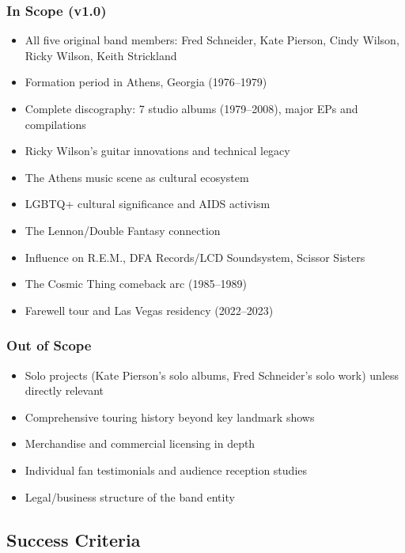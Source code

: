 \documentclass[11pt,letterpaper]{article}
\begin{document}
\subsubsection{In Scope (v1.0)}

\begin{itemize}[noitemsep]
  \item All five original band members: Fred Schneider, Kate Pierson, Cindy Wilson, Ricky Wilson, Keith Strickland
  \item Formation period in Athens, Georgia (1976--1979)
  \item Complete discography: 7 studio albums (1979--2008), major EPs and compilations
  \item Ricky Wilson's guitar innovations and technical legacy
  \item The Athens music scene as cultural ecosystem
  \item LGBTQ+ cultural significance and AIDS activism
  \item The Lennon/Double Fantasy connection
  \item Influence on R.E.M., DFA Records/LCD Soundsystem, Scissor Sisters
  \item The Cosmic Thing comeback arc (1985--1989)
  \item Farewell tour and Las Vegas residency (2022--2023)
\end{itemize}

\subsubsection{Out of Scope}

\begin{itemize}[noitemsep]
  \item Solo projects (Kate Pierson's solo albums, Fred Schneider's solo work) unless directly relevant
  \item Comprehensive touring history beyond key landmark shows
  \item Merchandise and commercial licensing in depth
  \item Individual fan testimonials and audience reception studies
  \item Legal/business structure of the band entity
\end{itemize}

\subsection{Success Criteria}
\end{document}
